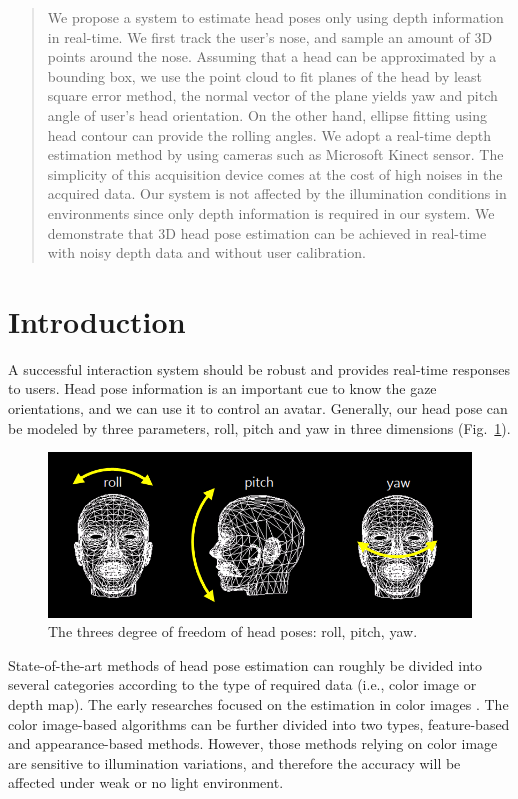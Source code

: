 \begin{abstract}
We propose a system to estimate head poses only using depth information in real-time. We first track the user’s nose, and sample an amount of 3D points around the nose. Assuming that a head can be approximated by a bounding box, we use the point cloud to fit planes of the head by least square error method, the normal vector of the plane yields yaw and pitch angle of user’s head orientation. On the other hand, ellipse fitting using head contour can provide the rolling angles. We adopt a real-time depth estimation method by using cameras such as Microsoft Kinect sensor. The simplicity of this acquisition device comes at the cost of high noises in the acquired data. Our system is not affected by the illumination conditions in environments since only depth information is required in our system. We demonstrate that 3D head pose estimation can be achieved in real-time with noisy depth data and without user calibration.
\end{abstract}

\section{Introduction}
\label{sec:1}
A successful interaction system should be robust and provides real-time responses to users. Head pose information is an important cue to know the gaze orientations, and we can use it to control an avatar. Generally, our head pose can be modeled by three parameters, roll, pitch and yaw in three dimensions (Fig.~\ref{fig:1}).
\begin{figure}
\includegraphics[width=1.0\linewidth]{./fig1.png}
\caption{The threes degree of freedom of head poses: roll, pitch, yaw.}
\label{fig:1}       %
\end{figure}
State-of-the-art methods of head pose estimation can roughly be divided into several categories according to the type of required data (i.e., color image or depth map). The early researches focused on the estimation in color images \cite{Ref15}. The color image-based algorithms can be further divided into two types, feature-based \cite{Ref1,Ref8,Ref10,Ref11,Ref18} and appearance-based \cite{Ref2,Ref4,Ref5,Ref6,Ref7,Ref17} methods. However, those methods relying on color image are sensitive to illumination variations, and therefore the accuracy will be affected under weak or no light environment.

